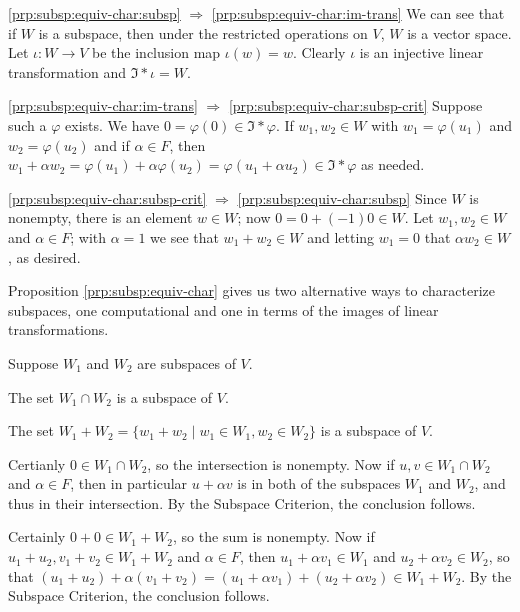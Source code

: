 \begin{theproof}
\begin{inparaenum}
\item[\ref{prp:subsp:equiv-char:subsp} $\Rightarrow$ \ref{prp:subsp:equiv-char:im-trans}] We can see that if $W$ is a subspace, then under the restricted operations on $V$, $W$ is a vector space. Let $\iota : W \rightarrow V$ be the inclusion map $\iota(w) = w$. Clearly $\iota$ is an injective linear transformation and $\Im*{\iota} = W$.
\item[\ref{prp:subsp:equiv-char:im-trans} $\Rightarrow$ \ref{prp:subsp:equiv-char:subsp-crit}] Suppose such a $\varphi$ exists. We have $0 = \varphi(0) \in \Im*{\varphi}$. If $w_1,w_2 \in W$ with $w_1 = \varphi(u_1)$ and $w_2 = \varphi(u_2)$ and if $\alpha \in F$, then $w_1+\alpha w_2 = \varphi(u_1)+\alpha\varphi(u_2) = \varphi(u_1 + \alpha u_2) \in \Im*{\varphi}$ as needed.
\item[\ref{prp:subsp:equiv-char:subsp-crit} $\Rightarrow$ \ref{prp:subsp:equiv-char:subsp}] Since $W$ is nonempty, there is an element $w \in W$; now $0 = 0 + (-1)0 \in W$. Let $w_1,w_2 \in W$ and $\alpha \in F$; with $\alpha = 1$ we see that $w_1 + w_2 \in W$ and letting $w_1 = 0$ that $\alpha w_2 \in W$, as desired. 
\end{inparaenum}
\end{theproof}

Proposition \ref{prp:subsp:equiv-char} gives us two alternative ways to characterize subspaces, one computational and one in terms of the images of linear transformations.

\begin{prp} 
\label{prp:subsp:sums-and-caps}
Suppose $W_1$ and $W_2$ are subspaces of $V$.
\begin{enumerate*}
\item The set $W_1 \cap W_2$ is a subspace of $V$.
\item The set $W_1 + W_2 = \{w_1 + w_2 \mid w_1 \in W_1, w_2 \in W_2\}$ is a subspace of $V$.
\end{enumerate*}
\end{prp}

\begin{theproof}
\begin{inparaenum}
\item Certianly $0 \in W_1 \cap W_2$, so the intersection is nonempty. Now if $u,v \in W_1 \cap W_2$ and $\alpha \in F$, then in particular $u + \alpha v$ is in both of the subspaces $W_1$ and $W_2$, and thus in their intersection. By the Subspace Criterion, the conclusion follows.
\item Certainly $0 + 0 \in W_1 + W_2$, so the sum is nonempty. Now if $u_1 + u_2,v_1+v_2 \in W_1+W_2$ and $\alpha \in F$, then $u_1 + \alpha v_1 \in W_1$ and $u_2 + \alpha v_2 \in W_2$, so that $(u_1+u_2) + \alpha(v_1+v_2) = (u_1 + \alpha v_1) + (u_2 + \alpha v_2) \in W_1 + W_2$. By the Subspace Criterion, the conclusion follows.
\end{inparaenum}
\end{theproof}

